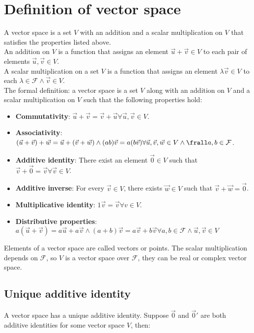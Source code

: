 \section{Definition of vector space}
A vector space is a set $V$ with an addition and a scalar multiplication on $V$ that satisfies the properties listed above.\\
An addition on $V$ is a function that assigns an element $\vec{u}+\vec{v}\in V$ to each pair of elements $\vec{u}, \vec{v}\in V$.\\
A scalar multiplication on a set $V$ is a function that assigns an element $\lambda\vec{v}\in V$ to each $\lambda\in\mathcal{F}\land\vec{v}\in V$.\\
The formal definition: a vector space is a set $V$ along with an addition on $V$ and a scalar multiplication on $V$ such that the following properties hold:

\begin{multicols}{2}
  \begin{itemize}
    \item\textbf{Commutativity}: $\vec{u}+\vec{v} = \vec{v}+\vec{u}\forall\vec{u},\vec{v}\in V$.
    \item\textbf{Associativity}: $(\vec{u} + \vec{v} ) + \vec{w} = \vec{u} + (\vec{v} + \vec{w})\land (ab)\vec{v} = a(b\vec{v})\forall \vec{u}, \vec{v},\vec{w}\in V\land \frall a,b\in\mathcal{F}$.
    \item\textbf{Additive identity}: There exist an element $\vec{0}\in V$ such that $\vec{v} + \vec{0} = \vec{v}\forall\vec{v}\in V$.
    \item\textbf{Additive inverse}: For every $\vec{v}\in V$, there exists $\vec{w}\in V$ such that $\vec{v}+\vec{w} = \vec{0}$.
    \item\textbf{Multiplicative identity}: $1\vec{v} = \vec{v}\forall v\in V$.
    \item\textbf{Distributive properties}: $a(\vec{u}+\vec{v}) = a\vec{u}+a\vec{v}\land(a+b)\vec{v} = a\vec{v} + b\vec{v}\forall a,b\in\mathcal{F}\land\vec{u},\vec{v}\in V$
  \end{itemize}
\end{multicols}

Elements of a vector space are called vectors or points.
The scalar multiplication depends on $\mathcal{F}$, so $V$ is a vector space over $\mathcal{F}$, they can be real or complex vector space.\\

  \subsection{Unique additive identity}
  A vector space has a unique additive identity.
  Suppose $\vec{0}$ and $\vec{0}'$ are both additive identities for some vector space $V$, then:

